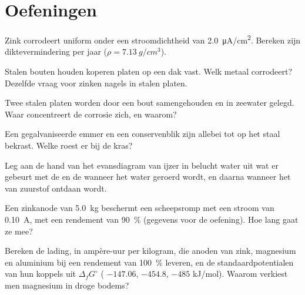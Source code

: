 \section{Oefeningen}

\begin{exercise}[$\star$]\label{exo:b2:corrosion:1}
Zink corrodeert uniform onder een stroomdichtheid van \qty{2.0}{\micro A/cm^2}.
Bereken zijn diktevermindering per jaar ($\rho = \qty{7.13}{g/cm^3}$).
\end{exercise}

\begin{exercise}[$\star$]\label{exo:b2:corrosion:2}
Stalen bouten houden koperen platen op een dak vast. Welk metaal corrodeert? Dezelfde vraag
voor zinken nagels in stalen platen.
\end{exercise}

\begin{exercise}[$\star$]\label{exo:b2:corrosion:3}
Twee stalen platen worden door een bout samengehouden en in zeewater gelegd. Waar
concentreert de corrosie zich, en waarom?
\end{exercise}

\begin{exercise}[$\star$]\label{exo:b2:corrosion:4}
Een gegalvaniseerde emmer en een conservenblik zijn allebei tot op het staal bekrast. Welke
roest er bij de kras?
\end{exercise}

\begin{exercise}[$\star\star$]\label{exo:b2:corrosion:5}
Leg aan de hand van het evansdiagram van ijzer in belucht water uit wat er gebeurt met de
 en de  wanneer het water geroerd wordt, en daarna wanneer het
van zuurstof ontdaan wordt.
\end{exercise}

\begin{exercise}[$\star\star$]\label{exo:b2:corrosion:6}
Een zinkanode van \qty{5.0}{kg} beschermt een scheepsromp met een stroom van
\qty{0.10}{A}, met een rendement van 90~\% (gegevens voor de oefening). Hoe lang
gaat ze mee?
\end{exercise}

\begin{exercise}[$\star\star$]\label{exo:b2:corrosion:7}
Bereken de lading, in ampère-uur per kilogram, die anoden van zink, magnesium
en aluminium bij een rendement van 100~\% leveren, en de standaardpotentialen van
hun koppels uit $\Delta_f G^\circ$ ( $-147.06$,  $-454.8$,
 $-485$ \unit{kJ/mol}). Waarom verkiest men magnesium in droge bodems?
\end{exercise}


